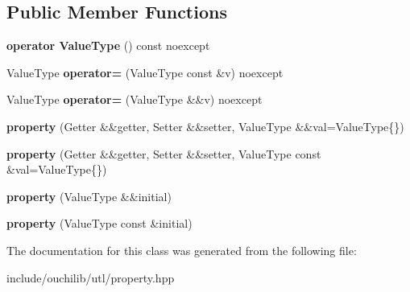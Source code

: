 \subsection*{Public Member Functions}
\begin{DoxyCompactItemize}
\item 
\mbox{\label{classouchi_1_1property_a25a9a519ef7e67015905ab49daa010e4}} 
{\bfseries operator Value\+Type} () const noexcept
\item 
\mbox{\label{classouchi_1_1property_ab36cbc9b93049cde03abb5aa045eb835}} 
Value\+Type {\bfseries operator=} (Value\+Type const \&v) noexcept
\item 
\mbox{\label{classouchi_1_1property_afc777c9d4621c592e729b7845467c78e}} 
Value\+Type {\bfseries operator=} (Value\+Type \&\&v) noexcept
\item 
\mbox{\label{classouchi_1_1property_a3dc06b93bfcf59814c486ae4ad21391a}} 
{\bfseries property} (Getter \&\&getter, Setter \&\&setter, Value\+Type \&\&val=Value\+Type\{\})
\item 
\mbox{\label{classouchi_1_1property_a25db96c40fdf31cb8c84bfe24410c258}} 
{\bfseries property} (Getter \&\&getter, Setter \&\&setter, Value\+Type const \&val=Value\+Type\{\})
\item 
\mbox{\label{classouchi_1_1property_a277e7087e4fb475f398ffb5504ce8922}} 
{\bfseries property} (Value\+Type \&\&initial)
\item 
\mbox{\label{classouchi_1_1property_ae6c40982f7bcd3237a2da3c9a86dee70}} 
{\bfseries property} (Value\+Type const \&initial)
\end{DoxyCompactItemize}


The documentation for this class was generated from the following file\+:\begin{DoxyCompactItemize}
\item 
include/ouchilib/utl/property.\+hpp\end{DoxyCompactItemize}
